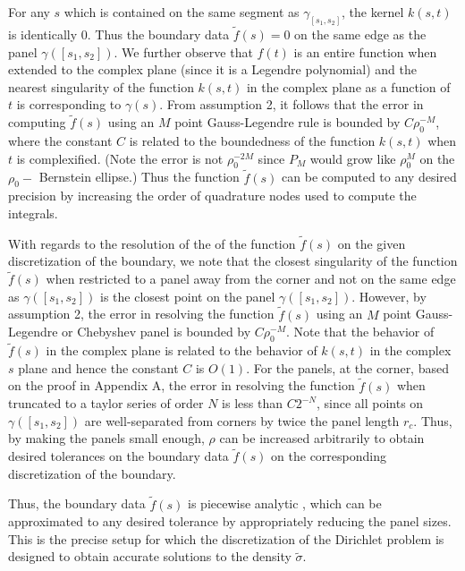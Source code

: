 \documentclass[12pt]{article}
\begin{document}
For any $s$ which is contained on the same segment as $\gamma_{[s_{1},s_{2}]}$, the kernel $k(s,t)$ is identically $0$.
Thus the boundary data $\tilde{f}(s)=0$  on the same edge as the panel $\gamma([s_{1},s_{2}])$. 
We further observe that $f(t)$ is an entire function when extended to the complex plane (since it is a Legendre polynomial)
and the nearest singularity of the function $k(s,t)$ in the complex plane as a function of $t$ is corresponding to $\gamma(s)$.
From assumption 2, it follows that
the error in computing $\tilde{f}(s)$ using an $M$ point Gauss-Legendre rule is bounded by $C \rho_{0}^{-M}$, where
the constant $C$ is related to the boundedness of the function $k(s,t)$ when $t$ is complexified.
(Note the error is not $\rho_{0}^{-2M}$ since $P_{M}$ would grow like $\rho_{0}^{M}$ on the $\rho_{0}-$ Bernstein ellipse.) 
Thus the function $\tilde{f}(s)$ can be computed to any desired precision by increasing the order of quadrature nodes
used to compute the integrals. 


With regards to the resolution of the of the function $\tilde{f}(s)$ on the given discretization of the boundary, 
we note that the closest singularity of the function $\tilde{f}(s)$ when restricted to a panel away from the corner
and not on the same edge as $\gamma([s_{1},s_{2}])$ is the closest point on the panel $\gamma([s_{1},s_{2}])$. 
However, by assumption 2, the error in resolving the function $\tilde{f}(s)$ using an $M$ point Gauss-Legendre
or Chebyshev panel is bounded by $C \rho_{0}^{-M}$. Note that the behavior of $\tilde{f}(s)$ in the complex plane is related
to the behavior of $k(s,t)$ in the complex $s$ plane and hence the constant $C$ is $O(1)$.
For the panels, at the corner, based on the proof in Appendix A, the error in resolving the function $\tilde{f}(s)$ when
truncated to a taylor series of order $N$ is less than $C 2^{-N}$, since all points on $\gamma([s_{1},s_{2}])$ are 
well-separated from corners by twice the panel length $r_{c}$. Thus, by making the panels small enough, $\rho$ can be increased arbitrarily to obtain desired tolerances on the boundary data $\tilde{f}(s)$ on the corresponding discretization of the boundary. 
 
 Thus, the boundary data $\tilde{f}(s)$ is piecewise analytic , which can be approximated to any desired tolerance by appropriately reducing the panel sizes. This is the precise setup for which the discretization of the Dirichlet problem is designed to obtain accurate solutions to the density $\tilde{\sigma}$. 
 
 
 
\end{document}
